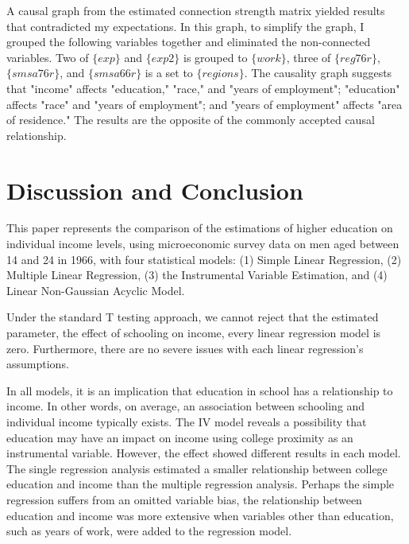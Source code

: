 \documentclass{article}\usepackage[]{graphicx}\usepackage[]{xcolor}
\makeatletter
\newenvironment{kframe}{%
 \def\at@end@of@kframe{}%
 \ifinner\ifhmode%
  \def\at@end@of@kframe{\end{minipage}}%
  \begin{minipage}{\columnwidth}%
 \fi\fi%
 \def\FrameCommand##1{\hskip\@totalleftmargin \hskip-\fboxsep
 \colorbox{shadecolor}{##1}\hskip-\fboxsep
     \hskip-\linewidth \hskip-\@totalleftmargin \hskip\columnwidth}%
 \MakeFramed {\advance\hsize-\width
   \@totalleftmargin\z@ \linewidth\hsize
   \@setminipage}}%
 {\par\unskip\endMakeFramed%
 \at@end@of@kframe}
\makeatother
\begin{document}
A causal graph from the estimated connection strength matrix yielded results that contradicted my expectations.
In this graph, to simplify the graph, I grouped the following variables together and eliminated the non-connected variables.
Two of $\{exp\}$ and $\{exp2\}$ is grouped to $\{work\}$, three of $\{reg76r\}$, $\{smsa76r\}$, and $\{smsa66r\}$ is a set to $\{regions\}$.
The causality graph suggests that 
"income" affects "education," "race," and "years of employment";
"education" affects "race" and "years of employment";
and "years of employment" affects "area of residence." 
The results are the opposite of the commonly accepted causal relationship.

\newpage

\section{Discussion and Conclusion}

This paper represents the comparison of the estimations of higher education on individual income levels, 
using microeconomic survey data on men aged between 14 and 24 in 1966, with four statistical models:
(1) Simple Linear Regression, (2) Multiple Linear Regression, (3) the Instrumental Variable Estimation, and (4) Linear Non-Gaussian Acyclic Model.

Under the standard T testing approach, we cannot reject that the estimated parameter, the effect of schooling on income, every linear regression model is zero.
Furthermore, there are no severe issues with each linear regression's assumptions.

\begin{kframe}


{\ttfamily\noindent\bfseries\color{errorcolor}{\#\# Error in data.frame(simple = c(lm1\$coefficients[1], lm1\$coefficients[2], : object 'lm1' not found}}

{\ttfamily\noindent\bfseries{}}\end{kframe}

In all models, it is an implication that education in school has a relationship to income. 
In other words, on average, an association between schooling and individual income typically exists. 
The IV model reveals a possibility that education may have an impact on income using college proximity as an instrumental variable.
However, the effect showed different results in each model. 
The single regression analysis estimated a smaller relationship between college education and income than 
the multiple regression analysis. 
Perhaps the simple regression suffers from an omitted variable bias, 
the relationship between education and income was more extensive when variables other than education, such as years of work, were added to the regression model.
\end{document}
